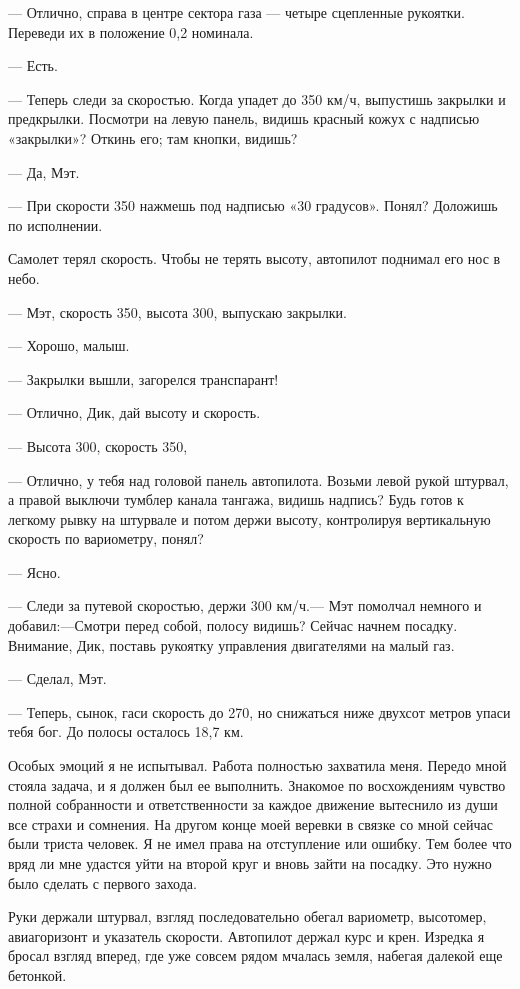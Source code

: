 \documentclass[11pt,a4paper,oneside]{article}
\begin{document}
— Отлично, справа в центре сектора газа — четыре сцепленные рукоятки. Переведи их в положение 0,2 номинала.

— Есть.

— Теперь следи за скоростью. Когда упадет до 350 км/ч, выпустишь закрылки и предкрылки. Посмотри на левую панель, видишь красный кожух с надписью «закрылки»? Откинь его; там кнопки, видишь?

— Да, Мэт.

— При скорости 350 нажмешь под надписью «30 градусов». Понял? Доложишь по исполнении.

Самолет терял скорость. Чтобы не терять высоту, автопилот поднимал его нос в небо.

— Мэт, скорость 350, высота 300, выпускаю закрылки.

— Хорошо, малыш.

— Закрылки вышли, загорелся транспарант!

— Отлично, Дик, дай высоту и скорость.

— Высота 300, скорость 350,

— Отлично, у тебя над головой панель автопилота. Возьми левой рукой штурвал, а правой выключи тумблер канала тангажа, видишь надпись? Будь готов к легкому рывку на штурвале и потом держи высоту, контролируя вертикальную скорость по вариометру, понял?

— Ясно.

— Следи за путевой скоростью, держи 300 км/ч.— Мэт помолчал немного и добавил:—Смотри перед собой, полосу видишь? Сейчас начнем посадку. Внимание, Дик, поставь рукоятку управления двигателями на малый газ.

— Сделал, Мэт.

— Теперь, сынок, гаси скорость до 270, но снижаться ниже двухсот метров упаси тебя бог. До полосы осталось 18,7 км.

Особых эмоций я не испытывал. Работа полностью захватила меня. Передо мной стояла задача, и я должен был ее выполнить. Знакомое по восхождениям чувство полной собранности и ответственности за каждое движение вытеснило из души все страхи и сомнения. На другом конце моей веревки в связке со мной сейчас были триста человек. Я не имел права на отступление или ошибку. Тем более что вряд ли мне удастся уйти на второй круг и вновь зайти на посадку. Это нужно было сделать с первого захода.

Руки держали штурвал, взгляд последовательно обегал вариометр, высотомер, авиагоризонт и указатель скорости. Автопилот держал курс и крен. Изредка я бросал взгляд вперед, где уже совсем рядом мчалась земля, набегая далекой еще бетонкой.
\end{document}
